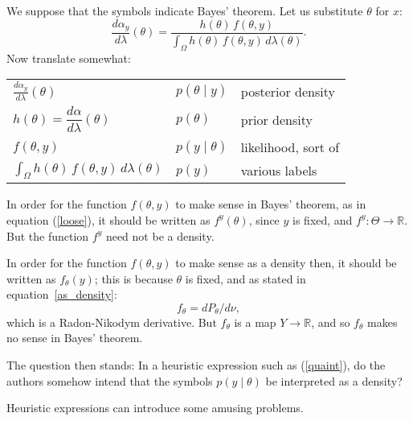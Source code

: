 \documentclass[
twoside=true,
paper=letter,
fontsize=11pt,
pagesize=auto,
leqno,
openany,
headsepline,
overfullrule,
]{scrbook}
\theoremstyle{plain}
\theoremstyle{plain}
\theoremstyle{definition}
\theoremstyle{bfnoteitalic}
\theoremstyle{bfnoteroman}
\newcommand{\R}{\mathbb{R}}
\newcommand{\funcf}{f}
\newcommand{\funch}{h}
\newcommand{\function}{f}
\newcommand{\measurespaceii}{Y}
\newcommand{\measnu}{\nu}
\newcommand{\measlambda}{\lambda}
\newcommand{\sspace}{\measurespaceii}%
\newcommand{\pspaceelt}{x}
\newcommand{\marginalone}{\alpha}%
\newcommand{\prior}{\marginalone}
\begin{document}
We suppose that the symbols indicate Bayes' theorem.
Let us substitute $\theta$ for $\pspaceelt$:
\begin{equation}\label{loose}
\frac{d \prior_y}{d\measlambda}(\theta)
=
\frac{\funch(\theta)\,\funcf(\theta,y)}
{\displaystyle
\int_{\Omega} \funch(\theta)\, \funcf(\theta,y)
\,d\measlambda(\theta)}.
\end{equation}
Now translate somewhat:
\begin{center}
\renewcommand{\arraystretch}{1.6}
\begin{tabular}{lll}
\toprule
$\displaystyle\frac{d \prior_y}{d\measlambda}(\theta)$ & $p(\theta\mid y)$ & posterior density \\
$\funch(\theta) = \dfrac{d\prior}{d\measlambda}(\theta)$
& $p(\theta)$ & prior density \\
$\funcf(\theta,y)$ & $p(y\mid\theta)$ & likelihood, sort of \\
$\int_{\Omega} \funch(\theta)\,\funcf(\theta,y)\,d\measlambda(\theta)$ & $p(y)$ & various labels \\
\bottomrule
\end{tabular}
\end{center}

In order for the function $\funcf(\theta,y)$ to  make sense in Bayes' theorem, as in equation (\ref{loose}), it should be written as $\funcf^y(\theta)$, since $y$ is fixed, and
$\funcf^y : \Theta \to \R$.
But the function $\funcf^y$ need not be a density.

In order for the function
$\funcf(\theta,y)$ to make sense as a density then, it should be written as $\funcf_\theta(y)$; this is because $\theta$ is fixed, and
as stated in equation~\ref{as_density}:
\[\function_\theta
=
d P_\theta/d\measnu,
\]
which is  a Radon-Nikodym derivative.
But $\function_\theta$ is a map $\sspace\to\R$, and so $\function_\theta$ makes no sense in Bayes' theorem.

The question then stands: In a heuristic expression such as (\ref{quaint}), do the authors  somehow intend that the symbols $p(y\mid\theta)$ be interpreted as a density?

Heuristic expressions can introduce some amusing problems.








\end{document}

